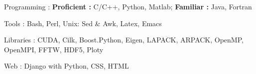 


\begin{cvskills}


\cvskill
{Programming : } %
{\textbf{Proficient :}  C/C++, Python, Matlab; 
  \textbf{Familiar :} Java, Fortran} %

\cvskill
{Tools : }
{Bash, Perl, Unix: Sed \& Awk, Latex, Emacs}

\cvskill
{Libraries : }
{CUDA, Cilk, Boost.Python, Eigen, LAPACK, ARPACK, OpenMP, OpenMPI, FFTW, HDF5, Ploty}


\cvskill
{Web : } %
{Django with Python, CSS, HTML} %




\end{cvskills}